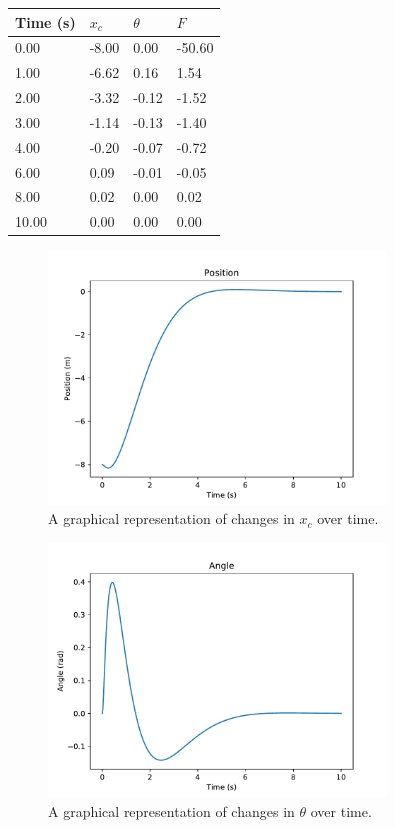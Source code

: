 \documentclass[11pt]{article}
\begin{document}
\begin{center}
    \begin{tabular}{|l|l|l|l|}
        \hline
        Time (s) & $x _c$ & $\theta$ & $F$ \\
        \hline
        0.00 & -8.00 & 0.00 & -50.60 \\
        \hline
        1.00 & -6.62 & 0.16 & 1.54 \\
        \hline
        2.00 & -3.32 & -0.12 & -1.52 \\
        \hline
        3.00 & -1.14 & -0.13 & -1.40 \\
        \hline
        4.00 & -0.20 & -0.07 & -0.72 \\
        \hline
        6.00 & 0.09 & -0.01 & -0.05 \\
        \hline
        8.00 & 0.02 & 0.00 & 0.02 \\
        \hline
        10.00 & 0.00 & 0.00 & 0.00 \\
        \hline
    \end{tabular}
     \label{motion_statistics}
\end{center}

\begin{figure}[H]
    \centering
    \includegraphics[width=0.8\textwidth]{position}
    \caption{\label{position} A graphical representation of changes in $x _c$ over time.}
\end{figure}

\begin{figure}[H]
    \centering
    \includegraphics[width=0.8\textwidth]{angle}
    \caption{\label{angle} A graphical representation of changes in $\theta$ over time.}
\end{figure}
\end{document}

